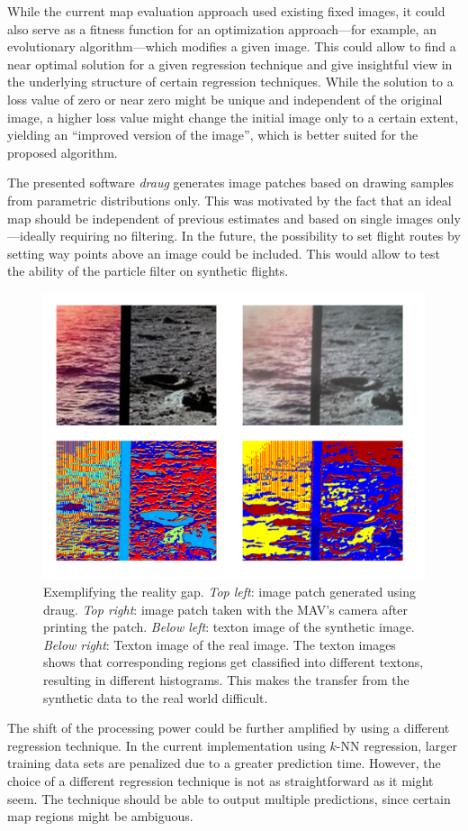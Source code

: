 \documentclass[11pt]{report}
\begin{document}
While the current map evaluation approach used existing fixed images,
it could also serve as a fitness function for an optimization
approach---for example, an evolutionary algorithm---which modifies a
given image. This could allow to find a near optimal solution for a
given regression technique and give insightful view in the underlying
structure of certain regression techniques. While the solution to a
loss value of zero or near zero might be unique and independent of the
original image, a higher loss value might change the initial image
only to a certain extent, yielding an ``improved version of the
image'', which is better suited for the proposed algorithm.

The presented software \emph{draug} generates image patches based on
drawing samples from parametric distributions only. This was motivated
by the fact that an ideal map should be independent of previous
estimates and based on single images only---ideally requiring no
filtering. In the future, the possibility to set flight routes by
setting way points above an image could be included. This would allow
to test the ability of the particle filter on synthetic flights.

\begin{figure}[h!]
\begin{center}
\includegraphics[width=0.448\columnwidth]{realitygap}
\caption{{\label{fig:realitygap}
Exemplifying the reality gap. \emph{Top left}: image patch generated using draug. \emph{Top
      right}: image patch taken with the MAV's camera after printing
    the patch. \emph{Below left}: texton image of the synthetic
    image. \emph{Below right}: Texton image of the real image. The
    texton images shows that corresponding regions get classified into
    different textons, resulting in different histograms. This makes
    the transfer from the synthetic data to the real world difficult.%
}}
\end{center}
\end{figure}

The shift of the processing power could be further amplified by using
a different regression technique. In the current implementation using
$k$-NN regression, larger training data sets are penalized due to a
greater prediction time. However, the choice of a different regression
technique is not as straightforward as it might seem. The technique
should be able to output multiple predictions, since certain map
regions might be ambiguous.
\end{document}
